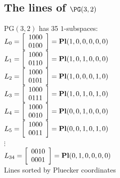 \subsection*{The lines of ${\rm \PG}(3,2)$}
PG$(3, 2)$ has 35 $1$-subspaces:\\
$L_{0}=\left[
\begin{array}{c}
1000\\
0100\\
\end{array}
\right]
={\rm\bf Pl}(1,0,0,0,0,0 )
$\\
$L_{1}=\left[
\begin{array}{c}
1000\\
0110\\
\end{array}
\right]
={\rm\bf Pl}(1,0,1,0,0,0 )
$\\
$L_{2}=\left[
\begin{array}{c}
1000\\
0101\\
\end{array}
\right]
={\rm\bf Pl}(1,0,0,0,1,0 )
$\\
$L_{3}=\left[
\begin{array}{c}
1000\\
0111\\
\end{array}
\right]
={\rm\bf Pl}(1,0,1,0,1,0 )
$\\
$L_{4}=\left[
\begin{array}{c}
1000\\
0010\\
\end{array}
\right]
={\rm\bf Pl}(0,0,1,0,0,0 )
$\\
$L_{5}=\left[
\begin{array}{c}
1000\\
0011\\
\end{array}
\right]
={\rm\bf Pl}(0,0,1,0,1,0 )
$\\
$\vdots$\\
$L_{34}=\left[
\begin{array}{c}
0010\\
0001\\
\end{array}
\right]
={\rm\bf Pl}(0,1,0,0,0,0 )
$\\
Lines sorted by Pluecker coordinates\\

